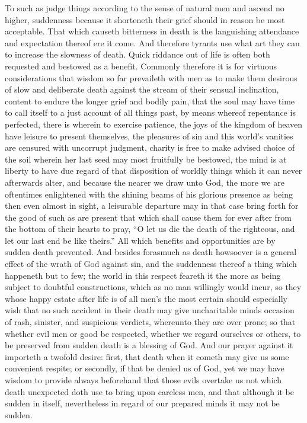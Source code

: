To such as judge things according to the sense of natural men and ascend no higher, suddenness because it shorteneth their grief should in reason be most acceptable. That which causeth bitterness in death is the languishing attendance and expectation thereof ere it come. And therefore tyrants use what art they can to increase the slowness of death. Quick riddance out of life is often both requested and bestowed as a benefit. Commonly therefore it is for virtuous considerations that wisdom so far prevaileth with men as to make them desirous of slow and deliberate death against the stream of their sensual inclination, content to endure the longer grief and bodily pain, that the soul may have time to call itself to a just account of all things past, by means whereof repentance is perfected, there is wherein to exercise patience, the joys of the kingdom of heaven have leisure to present themselves, the pleasures of sin and this world’s vanities are censured with uncorrupt judgment, charity is free to make advised choice of the soil wherein her last seed may most fruitfully be bestowed, the mind is at liberty to have due  regard of that disposition of worldly things which it can never afterwards alter, and because the nearer we draw unto God, the more we are oftentimes enlightened with the shining beams of his glorious presence as being then even almost in sight, a leisurable departure may in that case bring forth for the good of such as are present that which shall cause them for ever after from the bottom of their hearts to pray, “O let us die the death of the righteous, and let our last end be like theirs.” All which benefits and opportunities are by sudden death prevented.
And besides forasmuch as death howsoever is a general effect of the wrath of God against sin, and the suddenness thereof a thing which happeneth but to few; the world in this respect feareth it the more as being subject to doubtful constructions, which as no man willingly would incur, so they whose happy estate after life is of all men’s the most certain should especially wish that no such accident in their death may give uncharitable minds occasion of rash, sinister, and suspicious verdicts, whereunto they are over prone; so that whether evil men or good be respected, whether we regard ourselves or others, to be preserved from sudden death is a blessing of God. And our prayer against it importeth a twofold desire: first, that death when it cometh may give us some convenient respite; or secondly, if that be denied us of God, yet we may  have wisdom to provide always beforehand that those evils overtake us not which death unexpected doth use to bring upon careless men, and that although it be sudden in itself, nevertheless in regard of our prepared minds it may not be sudden.

